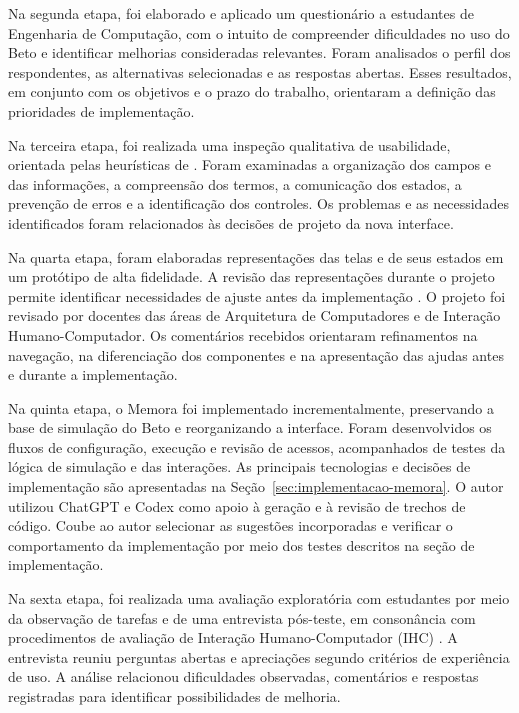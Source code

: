 Na segunda etapa, foi elaborado e aplicado um questionário a estudantes de Engenharia de Computação, com o intuito de compreender dificuldades no uso do Beto e identificar melhorias consideradas relevantes. Foram analisados o perfil dos respondentes, as alternativas selecionadas e as respostas abertas. Esses resultados, em conjunto com os objetivos e o prazo do trabalho, orientaram a definição das prioridades de implementação.

Na terceira etapa, foi realizada uma inspeção qualitativa de usabilidade, orientada pelas heurísticas de . Foram examinadas a organização dos campos e das informações, a compreensão dos termos, a comunicação dos estados, a prevenção de erros e a identificação dos controles. Os problemas e as necessidades identificados foram relacionados às decisões de projeto da nova interface.

Na quarta etapa, foram elaboradas representações das telas e de seus estados em um protótipo de alta fidelidade. A revisão das representações durante o projeto permite identificar necessidades de ajuste antes da implementação \cite{barbosa2010ihc}. O projeto foi revisado por docentes das áreas de Arquitetura de Computadores e de Interação Humano-Computador. Os comentários recebidos orientaram refinamentos na navegação, na diferenciação dos componentes e na apresentação das ajudas antes e durante a implementação.

Na quinta etapa, o Memora foi implementado incrementalmente, preservando a base de simulação do Beto e reorganizando a interface. Foram desenvolvidos os fluxos de configuração, execução e revisão de acessos, acompanhados de testes da lógica de simulação e das interações. As principais tecnologias e decisões de implementação são apresentadas na Seção~\ref{sec:implementacao-memora}. O autor utilizou ChatGPT e Codex como apoio à geração e à revisão de trechos de código. Coube ao autor selecionar as sugestões incorporadas e verificar o comportamento da implementação por meio dos testes descritos na seção de implementação.

Na sexta etapa, foi realizada uma avaliação exploratória com estudantes por meio da observação de tarefas e de uma entrevista pós-teste, em consonância com procedimentos de avaliação de Interação Humano-Computador (IHC) \cite{barbosa2010ihc}. A entrevista reuniu perguntas abertas e apreciações segundo critérios de experiência de uso. A análise relacionou dificuldades observadas, comentários e respostas registradas para identificar possibilidades de melhoria.
